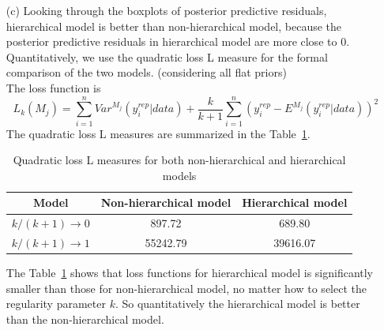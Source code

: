 \documentclass[]{article}
\begin{document}
\begin{enumerate}
{\begin{itemize}
\begin{figure}[ht!]
				\label{pos1}
			\end{figure}
			Comparing the posterior distributions between Figure~\ref{pos0} and Figure~\ref{pos1}, the difference with respect to the parameter $\lambda$ is a little significant. The posterior distribution of $\lambda$ with flat prior is relatively flatter than that with prior $p(\lambda) = (\lambda+1)^{-2}$, which means the prior sensitivity is not very significant and posterior distribution shows that $\lambda$ is around $7$. And comparing the empirical posterior predictive residuals Figure~\ref{box0} and ~\ref{pos1}, the difference is not  significant either. Perhaps, the model with prior $p(\lambda) = (\lambda+1)^{-2}$ is a little better than the model with flat prior.
			\item[(c)] Looking through the boxplots of posterior predictive residuals, hierarchical model is better than non-hierarchical model, because the posterior predictive residuals in hierarchical model are more close to $0$.\\
			Quantitatively, we use the quadratic loss L measure for the formal comparison of the two models. (considering all flat priors) \\
			The loss function is
			\begin{equation}
			L_k(M_j) = \sum_{i = 1}^{n} Var^{M_j}(y_i^{rep}|data) + \frac{k}{k+1}\sum_{i = 1}^{n} (y_i^{rep} - E^{M_j}(y_i^{rep}|data))^2
			\end{equation}
			The quadratic loss L measures are summarized in the Table~\ref{loss}.\\
			\begin{table}[ht!]
				\centering
				\caption{Quadratic loss L measures for both non-hierarchical and hierarchical models}
				\begin{tabular}{|c|c|c|}
					\hline
					Model & Non-hierarchical model & Hierarchical model\\
					\hline
					$k/(k+1) \rightarrow 0$ & 897.72 & 689.80\\
					\hline
					$k/(k+1) \rightarrow 1$ & 55242.79 & 39616.07\\
					\hline
				\end{tabular}
				\label{loss}
			\end{table}
			The Table~\ref{loss} shows that loss functions for hierarchical model is significantly smaller than those for non-hierarchical model, no matter how to select the regularity parameter $k$. So quantitatively the hierarchical model is better than the non-hierarchical model.
		\end{itemize}
		
}
\end{enumerate}
\end{document}
